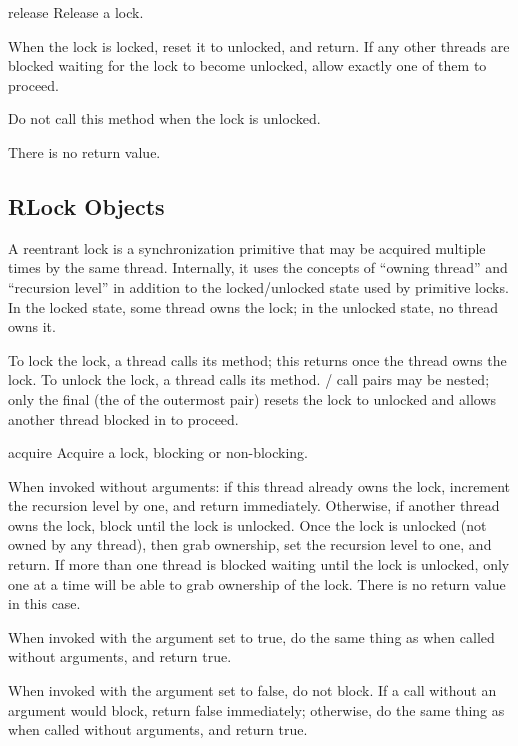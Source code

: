 \begin{methoddesc}{release}{}
Release a lock.

When the lock is locked, reset it to unlocked, and return.  If
any other threads are blocked waiting for the lock to become
unlocked, allow exactly one of them to proceed.

Do not call this method when the lock is unlocked.

There is no return value.
\end{methoddesc}


\subsection{RLock Objects \label{rlock-objects}}

A reentrant lock is a synchronization primitive that may be
acquired multiple times by the same thread.  Internally, it uses
the concepts of ``owning thread'' and ``recursion level'' in
addition to the locked/unlocked state used by primitive locks.  In
the locked state, some thread owns the lock; in the unlocked
state, no thread owns it.

To lock the lock, a thread calls its  method; this
returns once the thread owns the lock.  To unlock the lock, a
thread calls its  method.
/ call pairs may be nested; only
the final  (the  of the outermost
pair) resets the lock to unlocked and allows another thread blocked in
 to proceed.

\begin{methoddesc}{acquire}{}
Acquire a lock, blocking or non-blocking.

When invoked without arguments: if this thread already owns
the lock, increment the recursion level by one, and return
immediately.  Otherwise, if another thread owns the lock,
block until the lock is unlocked.  Once the lock is unlocked
(not owned by any thread), then grab ownership, set the
recursion level to one, and return.  If more than one thread
is blocked waiting until the lock is unlocked, only one at a
time will be able to grab ownership of the lock.  There is no
return value in this case.

When invoked with the  argument set to true, do the
same thing as when called without arguments, and return true.

When invoked with the  argument set to false, do not
block.  If a call without an argument would block, return false
immediately; otherwise, do the same thing as when called
without arguments, and return true.
\end{methoddesc}

